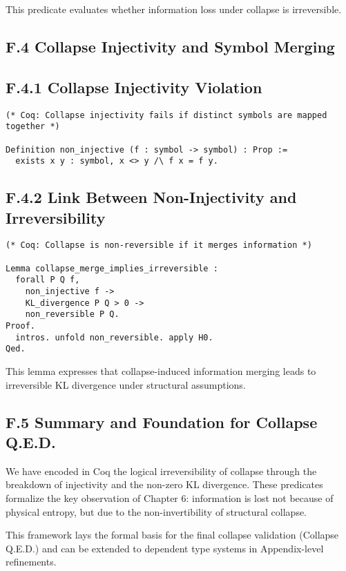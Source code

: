 \documentclass[11pt]{article}
\begin{document}
This predicate evaluates whether information loss under collapse is irreversible.

\subsection*{F.4 Collapse Injectivity and Symbol Merging}

\subsection*{F.4.1 Collapse Injectivity Violation}

\begin{lstlisting}
(* Coq: Collapse injectivity fails if distinct symbols are mapped together *)

Definition non_injective (f : symbol -> symbol) : Prop :=
  exists x y : symbol, x <> y /\ f x = f y.
\end{lstlisting}

\subsection*{F.4.2 Link Between Non-Injectivity and Irreversibility}

\begin{lstlisting}
(* Coq: Collapse is non-reversible if it merges information *)

Lemma collapse_merge_implies_irreversible :
  forall P Q f,
    non_injective f ->
    KL_divergence P Q > 0 ->
    non_reversible P Q.
Proof.
  intros. unfold non_reversible. apply H0.
Qed.
\end{lstlisting}

This lemma expresses that collapse-induced information merging leads to irreversible KL divergence under structural assumptions.

\subsection*{F.5 Summary and Foundation for Collapse Q.E.D.}

We have encoded in Coq the logical irreversibility of collapse through the breakdown of injectivity and the non-zero KL divergence. These predicates formalize the key observation of Chapter 6: information is lost not because of physical entropy, but due to the non-invertibility of structural collapse.

This framework lays the formal basis for the final collapse validation (Collapse Q.E.D.) and can be extended to dependent type systems in Appendix-level refinements.
\end{document}
